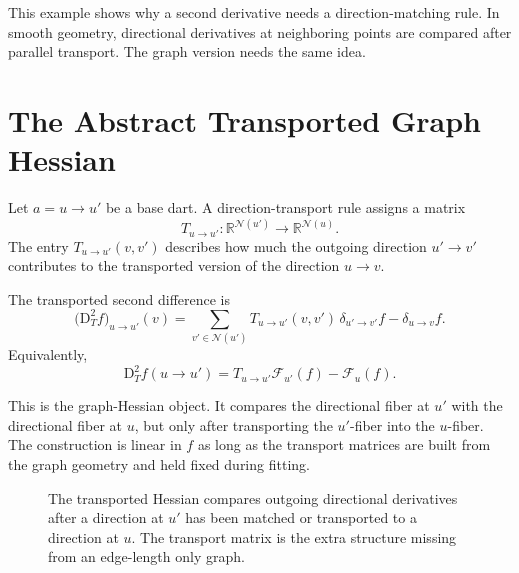 \documentclass[11pt]{article}
\newcommand{\R}{\mathbb R}
\newcommand{\N}{\mathcal N}
\newcommand{\F}{\mathcal F}
\newcommand{\D}{\mathrm D}
\begin{document}
This example shows why a second derivative needs a direction-matching rule.
In smooth geometry, directional derivatives at neighboring points are compared
after parallel transport.  The graph version needs the same idea.

\section{The Abstract Transported Graph Hessian}

Let \(a=u\to u'\) be a base dart.  A direction-transport rule assigns a matrix
\[
  T_{u\to u'}:\R^{\N(u')}\to\R^{\N(u)}.
\]
The entry \(T_{u\to u'}(v,v')\) describes how much the outgoing direction
\(u'\to v'\) contributes to the transported version of the direction
\(u\to v\).

The transported second difference is
\[
  \bigl(\D_T^2 f\bigr)_{u\to u'}(v)
  =
  \sum_{v'\in\N(u')}
  T_{u\to u'}(v,v')\,\delta_{u'\to v'}f
  -
  \delta_{u\to v}f.
\]
Equivalently,
\[
  \D_T^2 f(u\to u')
  =
  T_{u\to u'}\F_{u'}(f)-\F_u(f).
\]

This is the graph-Hessian object.  It compares the directional fiber at
\(u'\) with the directional fiber at \(u\), but only after transporting the
\(u'\)-fiber into the \(u\)-fiber.  The construction is linear in \(f\) as long
as the transport matrices are built from the graph geometry and held fixed
during fitting.

\begin{figure}[ht]
\centering
{}
\caption{The transported Hessian compares outgoing directional derivatives
after a direction at \(u'\) has been matched or transported to a direction at
\(u\).  The transport matrix is the extra structure missing from an edge-length
only graph.}
\end{figure}
\end{document}
